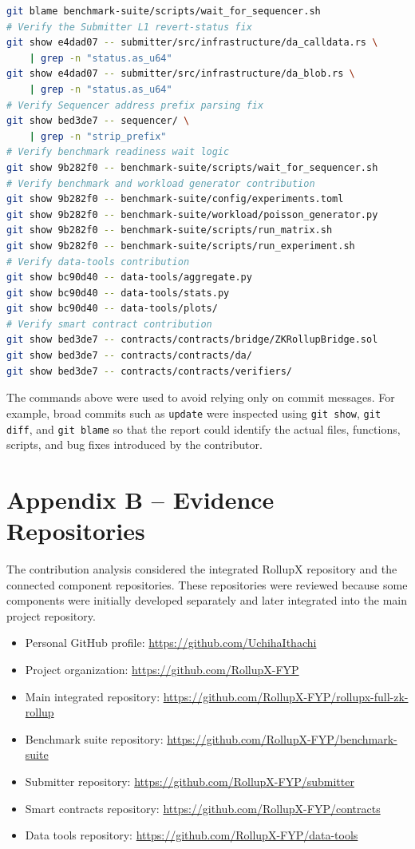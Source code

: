 \begin{lstlisting}[language=bash, basicstyle=\ttfamily]
git blame benchmark-suite/scripts/wait_for_sequencer.sh
# Verify the Submitter L1 revert-status fix
git show e4dad07 -- submitter/src/infrastructure/da_calldata.rs \
    | grep -n "status.as_u64"
git show e4dad07 -- submitter/src/infrastructure/da_blob.rs \
    | grep -n "status.as_u64"
# Verify Sequencer address prefix parsing fix
git show bed3de7 -- sequencer/ \
    | grep -n "strip_prefix"
# Verify benchmark readiness wait logic
git show 9b282f0 -- benchmark-suite/scripts/wait_for_sequencer.sh
# Verify benchmark and workload generator contribution
git show 9b282f0 -- benchmark-suite/config/experiments.toml
git show 9b282f0 -- benchmark-suite/workload/poisson_generator.py
git show 9b282f0 -- benchmark-suite/scripts/run_matrix.sh
git show 9b282f0 -- benchmark-suite/scripts/run_experiment.sh
# Verify data-tools contribution
git show bc90d40 -- data-tools/aggregate.py
git show bc90d40 -- data-tools/stats.py
git show bc90d40 -- data-tools/plots/
# Verify smart contract contribution
git show bed3de7 -- contracts/contracts/bridge/ZKRollupBridge.sol
git show bed3de7 -- contracts/contracts/da/
git show bed3de7 -- contracts/contracts/verifiers/
\end{lstlisting}
The commands above were used to avoid relying only on commit messages. For example, broad commits such as \texttt{update} were inspected using \texttt{git show}, \texttt{git diff}, and \texttt{git blame} so that the report could identify the actual files, functions, scripts, and bug fixes introduced by the contributor.
\section*{Appendix B -- Evidence Repositories}
The contribution analysis considered the integrated RollupX repository and the connected component repositories. These repositories were reviewed because some components were initially developed separately and later integrated into the main project repository.
\begin{itemize}
    \item Personal GitHub profile: \url{https://github.com/UchihaIthachi}
    \item Project organization: \url{https://github.com/RollupX-FYP}
    \item Main integrated repository: \url{https://github.com/RollupX-FYP/rollupx-full-zk-rollup}
    \item Benchmark suite repository: \url{https://github.com/RollupX-FYP/benchmark-suite}
    \item Submitter repository: \url{https://github.com/RollupX-FYP/submitter}
    \item Smart contracts repository: \url{https://github.com/RollupX-FYP/contracts}
    \item Data tools repository: \url{https://github.com/RollupX-FYP/data-tools}
\end{itemize}
